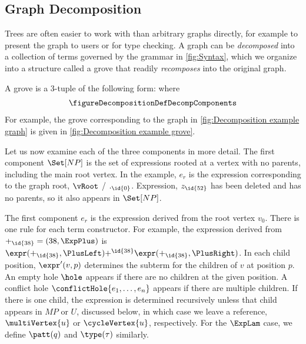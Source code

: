 
\subsection{Graph Decomposition}%
\label{sub:Graph Decomposition}



Trees are often easier to work with than arbitrary graphs directly, for example to present the graph to users or for type checking.
A graph can be \emph{decomposed} into a collection of terms governed by the grammar in \autoref{fig:Syntax}, which we organize into a structure called a grove that readily \emph{recomposes} into the original graph.

\figureDecompExample


A grove is a 3-tuple of the following form:
    \figureDecompositionDefSets
where
\begin{align*}
  \figureDecompositionDefDecompComponents
\end{align*}
For example, the grove corresponding to the graph in \autoref{fig:Decomposition example graph} is
given in \autoref{fig:Decomposition example grove}.

Let us now examine each of the three components in more detail.
%
The first component $\Set[NP]$ is the set of expressions rooted at a vertex with no parents, including the main root vertex.
In the example, $e_r$ is the expression corresponding to the graph root, $\vRoot$ / $._{\id{0}}$.
Expression, $z_{\id{52}}$ has been deleted and has no parents, so it also appears in $\Set[NP]$.

The first component $e_r$ is the expression derived from the root vertex $v_0$.
There is one rule for each term constructor.
For example, the expression derived from ${+}_{\id{38}} = (38, \ExpPlus)$ is $\expr({+}_{\id{38}}, \PlusLeft) \text{+}^ {\id{38}} \expr({+}_{\id{38}}, \PlusRight)$.
In each child position, $\expr'(v, p)$ determines the subterm for the children of $v$ at position $p$.
An empty hole $\hole$ appears if there are no children at the given position.
A conflict hole $\conflictHole{e_1,\ldots,e_n}$ appears if there are multiple children.
If there is one child, the expression is determined recursively unless that child appears in $MP$ or $U$, discussed below, in which case we leave a reference, $\multiVertex{u}$ or $\cycleVertex{u}$, respectively.
For the $\ExpLam$ case, we define $\patt(q)$ and $\type(\tau)$ similarly.

